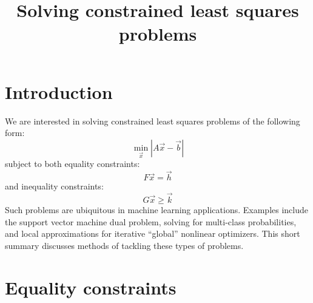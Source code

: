 \documentclass{article}
\title{Solving constrained least squares problems}
\newcommand{\mat}{A}
\newcommand{\sol}{b}
\newcommand{\eqmat}{F}
\newcommand{\eqvec}{h}
\newcommand{\ineqmat}{G}
\newcommand{\ineqvec}{k}
\newcommand{\coord}{x}
\begin{document}
\tableofcontents

\section{Introduction}

We are interested in solving constrained least squares problems of 
the following form:
\begin{equation}
	\min_{\vec \coord} | \mat \vec \coord - \vec \sol |
	\label{least_squares}
\end{equation}
subject to both equality constraints:
\begin{equation}
	\eqmat \vec \coord = \vec \eqvec 
\end{equation}
and inequality constraints:
\begin{equation}
	\ineqmat \vec \coord \ge \vec \ineqvec
	\label{inequality}
\end{equation}
Such problems are ubiquitous in machine learning applications.
Examples include the support vector machine dual problem, solving
for multi-class probabilities, and local approximations for iterative 
``global'' nonlinear optimizers.
This short summary discusses methods of tackling these types of problems.

\section{Equality constraints}
\end{document}

